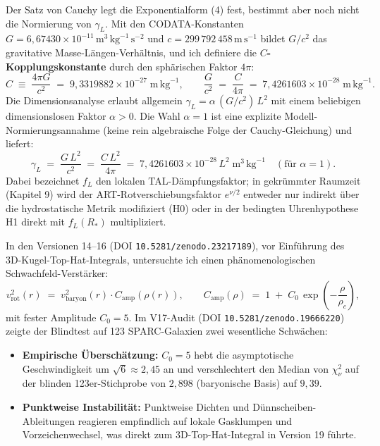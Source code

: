 \documentclass[10pt,a4paper]{article}
\begin{document}
\par
Der Satz von Cauchy legt die Exponentialform (4) fest, bestimmt aber noch nicht die Normierung von $\gamma_L$. Mit den CODATA-Konstanten $G = 6{,}67430\times 10^{-11}\,\text{m}^3\,\text{kg}^{-1}\,\text{s}^{-2}$ und $c = 299\,792\,458\,\text{m}\,\text{s}^{-1}$ bildet $G/c^2$ das gravitative Masse-L\"angen-Verh\"altnis, und ich definiere die \textbf{$C$-Kopplungskonstante} durch den sph\"arischen Faktor $4\pi$:
\begin{equation}
  C \;\equiv\; \frac{4\pi G}{c^2} \;=\; 9{,}3319882\times 10^{-27}\;\text{m}\,\text{kg}^{-1}, \qquad
  \frac{G}{c^2} \;=\; \frac{C}{4\pi} \;=\; 7{,}4261603\times 10^{-28}\;\text{m}\,\text{kg}^{-1}.
\end{equation}
Die Dimensionsanalyse erlaubt allgemein $\gamma_L = \alpha\,(G/c^2)\,L^2$ mit einem beliebigen dimensionslosen Faktor $\alpha > 0$. Die Wahl $\alpha = 1$ ist eine explizite Modell-Normierungsannahme (keine rein algebraische Folge der Cauchy-Gleichung) und liefert:
\begin{equation}
  \gamma_L \;=\; \frac{G\,L^2}{c^2} \;=\; \frac{C\,L^2}{4\pi} \;=\; 7{,}4261603\times 10^{-28}\,L^2\;\text{m}^3\,\text{kg}^{-1}\quad(\text{f\"ur }\alpha=1).
\end{equation}
Dabei bezeichnet $f_L$ den lokalen TAL-D\"ampfungsfaktor; in gekr\"ummter Raumzeit (Kapitel 9) wird der ART-Rotverschiebungsfaktor $e^{\nu/2}$ entweder nur indirekt \"uber die hydrostatische Metrik modifiziert (H0) oder in der bedingten Uhrenhypothese H1 direkt mit $f_L(R_*)$ multipliziert.

\par
In den Versionen 14--16 (DOI \texttt{10.5281/zenodo.23217189}), vor Einf\"uhrung des 3D-Kugel-Top-Hat-Integrals, untersuchte ich einen ph\"anomenologischen Schwachfeld-Verst\"arker:
\begin{equation}
  v_{\text{rot}}^2(r) \;=\; v_{\text{baryon}}^2(r)\cdot C_{\text{amp}}(\rho(r)), \qquad C_{\text{amp}}(\rho) \;=\; 1 \;+\; C_0\,\exp\!\left(-\frac{\rho}{\rho_c}\right),
\end{equation}
mit fester Amplitude $C_0 = 5$. Im V17-Audit (DOI \texttt{10.5281/zenodo.19666220}) zeigte der Blindtest auf 123 SPARC-Galaxien zwei wesentliche Schw\"achen:
\begin{itemize}\setlength{\itemsep}{1.5pt}\setlength{\parskip}{0pt}\setlength{\topsep}{1pt}
  \item \textbf{Empirische \"Ubersch\"atzung:} $C_0=5$ hebt die asymptotische Geschwindigkeit um $\sqrt{6}\approx 2{,}45$ an und verschlechtert den Median von $\chi^2_\nu$ auf der blinden 123er-Stichprobe von $2{,}898$ (baryonische Basis) auf $9{,}39$.
  \item \textbf{Punktweise Instabilit\"at:} Punktweise Dichten und D\"unnscheiben-Ableitungen reagieren empfindlich auf lokale Gasklumpen und Vorzeichenwechsel, was direkt zum 3D-Top-Hat-Integral in Version 19 f\"uhrte.
\end{itemize}
\newpage
\end{document}
